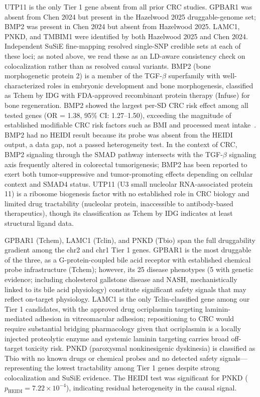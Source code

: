 \documentclass[11pt,a4paper]{article}
\begin{document}
UTP11 is the only Tier 1 gene absent from all prior CRC studies. GPBAR1 was
absent from Chen 2024 but present in the Hazelwood 2025 druggable-genome set;
BMP2 was present in Chen 2024 but absent from Hazelwood 2025. LAMC1, PNKD, and
TMBIM1 were identified by both Hazelwood 2025 and Chen 2024. Independent
SuSiE fine-mapping resolved single-SNP credible sets at each of these loci; as
noted above, we read these as an LD-aware consistency check on colocalization
rather than as resolved causal variants. BMP2 (bone morphogenetic protein 2) is a member of the
TGF-$\beta$ superfamily with well-characterized roles in embryonic development
and bone morphogenesis, classified as Tchem by IDG with FDA-approved
recombinant protein therapy (Infuse) for bone regeneration. BMP2 showed the
largest per-SD CRC risk effect among all tested genes (OR = 1.38, 95\% CI:
1.27--1.50), exceeding the magnitude of established modifiable CRC risk
factors such as BMI and processed meat intake~\cite{papadimitriou2021umbrella}. BMP2 had
no HEIDI result because its probe was absent from the HEIDI output, a data gap,
not a passed heterogeneity test. In the context of
CRC, BMP2 signaling through the SMAD pathway intersects with the TGF-$\beta$
signaling axis frequently altered in colorectal tumorigenesis; BMP2 has been
reported to exert both tumor-suppressive and tumor-promoting effects depending
on cellular context and SMAD4 status. UTP11 (U3 small nucleolar
RNA-associated protein 11) is a ribosome biogenesis factor with no established
role in CRC biology and limited drug tractability (nucleolar protein,
inaccessible to antibody-based therapeutics), though its classification as
Tchem by IDG indicates at least structural ligand data.

GPBAR1 (Tchem), LAMC1 (Tclin), and PNKD (Tbio) span the full druggability
gradient among the chr2 and chr1 Tier 1 genes. GPBAR1 is the most druggable of
the three, as a G-protein-coupled bile acid receptor with established chemical
probe infrastructure (Tchem); however, its 25 disease phenotypes (5 with
genetic evidence; including cholesterol gallstone disease and NASH, mechanistically
linked to its bile acid physiology) constitute significant safety signals that
may reflect on-target physiology. LAMC1 is the only Tclin-classified gene
among our Tier 1 candidates, with the approved drug ocriplasmin targeting
laminin-mediated adhesion in vitreomacular adhesion; repositioning to CRC would
require substantial bridging pharmacology given that ocriplasmin is a
locally injected proteolytic enzyme and systemic laminin targeting carries
broad off-target toxicity risk. PNKD (paroxysmal nonkinesigenic dyskinesia) is
classified as Tbio with no known drugs or chemical probes and no detected
safety signals---representing the lowest tractability among Tier 1 genes
despite strong colocalization and SuSiE evidence. The HEIDI test was
significant for PNKD ($p_{\text{HEIDI}} = 7.22 \times 10^{-4}$), indicating
residual heterogeneity in the causal signal.
\end{document}
